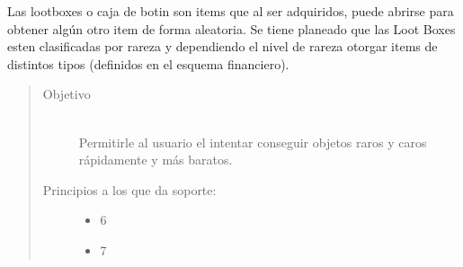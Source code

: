    Las lootboxes o caja de botin son items que al ser adquiridos, puede abrirse para obtener algún otro item de forma aleatoria. Se tiene planeado que las Loot Boxes esten clasificadas por rareza y dependiendo el nivel de rareza otorgar items de distintos tipos (definidos en el esquema financiero).
    
    
    \begin{quote}
    \begin{description}
    \item[Objetivo] \hfill\\
        Permitirle al usuario el intentar conseguir objetos raros y caros rápidamente y más baratos.
    
    \item[Principios a los que da soporte:] \hfill
        \begin{itemize}
            \item 6 \principioVI
            \item 7 \principioVII
        \end{itemize}
    \end{description}
    \end{quote}